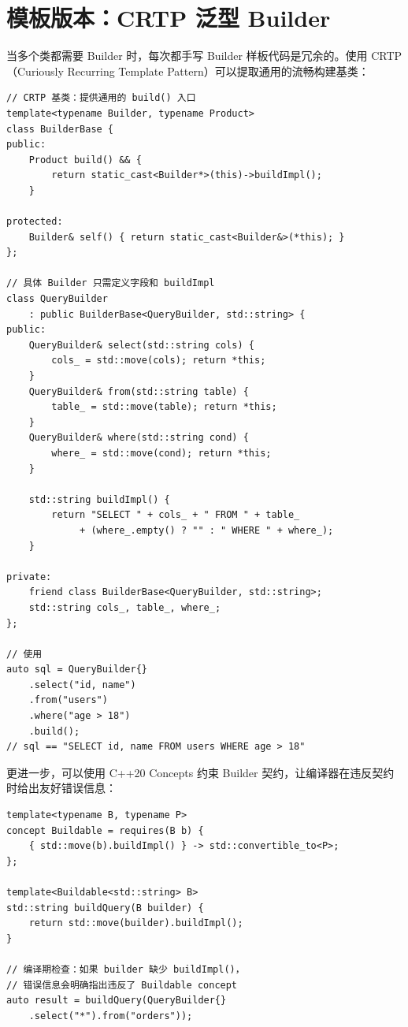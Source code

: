 \documentclass[12pt,a4paper,fontset=fandol]{ctexbook}
\begin{document}
\section{模板版本：CRTP 泛型 Builder}

当多个类都需要 Builder 时，每次都手写 Builder 样板代码是冗余的。使用 CRTP（Curiously Recurring Template Pattern）可以提取通用的流畅构建基类：

\begin{lstlisting}[style=cppstyle, caption={CRTP 泛型 Builder 基类 --- C++20}]
// CRTP 基类：提供通用的 build() 入口
template<typename Builder, typename Product>
class BuilderBase {
public:
    Product build() && {
        return static_cast<Builder*>(this)->buildImpl();
    }

protected:
    Builder& self() { return static_cast<Builder&>(*this); }
};

// 具体 Builder 只需定义字段和 buildImpl
class QueryBuilder
    : public BuilderBase<QueryBuilder, std::string> {
public:
    QueryBuilder& select(std::string cols) {
        cols_ = std::move(cols); return *this;
    }
    QueryBuilder& from(std::string table) {
        table_ = std::move(table); return *this;
    }
    QueryBuilder& where(std::string cond) {
        where_ = std::move(cond); return *this;
    }

    std::string buildImpl() {
        return "SELECT " + cols_ + " FROM " + table_
             + (where_.empty() ? "" : " WHERE " + where_);
    }

private:
    friend class BuilderBase<QueryBuilder, std::string>;
    std::string cols_, table_, where_;
};

// 使用
auto sql = QueryBuilder{}
    .select("id, name")
    .from("users")
    .where("age > 18")
    .build();
// sql == "SELECT id, name FROM users WHERE age > 18"
\end{lstlisting}

更进一步，可以使用 C++20 Concepts 约束 Builder 契约，让编译器在违反契约时给出友好错误信息：

\begin{lstlisting}[style=cppstyle, caption={C++20 Concept 约束 Builder}]
template<typename B, typename P>
concept Buildable = requires(B b) {
    { std::move(b).buildImpl() } -> std::convertible_to<P>;
};

template<Buildable<std::string> B>
std::string buildQuery(B builder) {
    return std::move(builder).buildImpl();
}

// 编译期检查：如果 builder 缺少 buildImpl()，
// 错误信息会明确指出违反了 Buildable concept
auto result = buildQuery(QueryBuilder{}
    .select("*").from("orders"));
\end{lstlisting}
\end{document}
